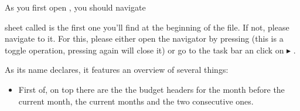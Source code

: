 As you first open \tfn, you should navigate

sheet called  is the first one you'll find at the beginning of the file.
If not, please navigate to it.
For this, please either open the navigator by pressing  (this is a toggle operation, pressing  again will close it) or go to the task bar an click on  \( \blacktriangleright \) .

As its name declares, it features an overview of several things:
\begin{itemize}
	\item First of, on top there are the the budget headers for the month before the current month, the current months and the two consecutive ones.
\end{itemize}

